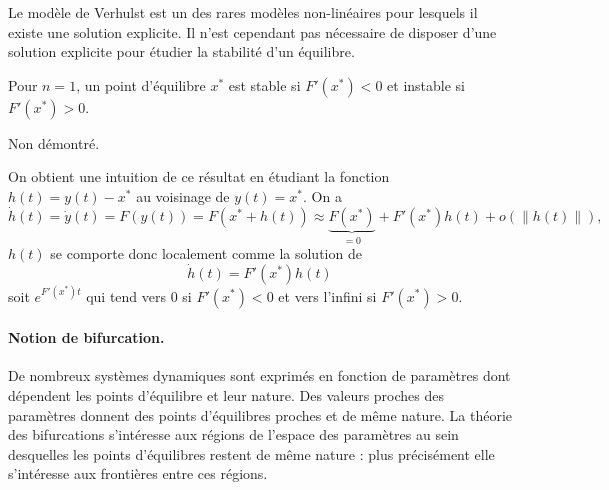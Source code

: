\remark
Le modèle de Verhulst est un des rares modèles non-linéaires pour lesquels il existe une solution explicite. Il n'est cependant pas nécessaire de disposer d'une solution explicite pour étudier la stabilité d'un équilibre.

\begin{theorem}[Stabilité ($n = 1$)]
  Pour $n=1$, un point d'équilibre $x^*$ est stable si $F'(x^*) < 0$ et instable si $F'(x^*) > 0$.
\end{theorem}

\proof Non démontré. \eproof

\remark
On obtient une intuition de ce résultat en étudiant la fonction $h(t) = y(t) - x^*$ au voisinage de $y(t) = x^*$. On a
$$
\dot h(t) = \dot y(t) = F(y(t)) = F(x^* + h(t)) \approx \underset{=0}{\underbrace{F(x^*)}} + F'(x^*) h(t) + o(\|h(t)\|),
$$
$h(t)$ se comporte donc localement comme la solution de 
$$
\dot h(t) = F'(x^*) h(t)
$$
soit $e ^{F'(x^*) t}$ qui tend vers 0 si $F'(x^*) < 0$ et vers l'infini si $F'(x^*) > 0$.

\paragraph*{Notion de bifurcation.}
De nombreux systèmes dynamiques sont exprimés en fonction de paramètres dont dépendent les points d'équilibre et leur nature. Des valeurs proches des paramètres donnent des points d'équilibres proches et de même nature. La théorie des bifurcations s'intéresse aux régions de l'espace des paramètres au sein desquelles les points d'équilibres restent de même nature : plus précisément elle s'intéresse aux frontières entre ces régions.


